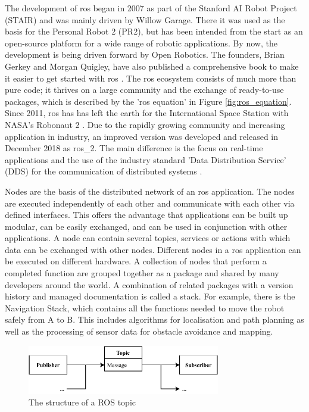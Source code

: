 The development of \gls{ros} began in 2007 as part of the Stanford AI Robot Project (STAIR) and was mainly driven by Willow Garage. There it was used as the basis for the Personal Robot 2 (PR2), but has been intended from the start as an open-source platform for a wide range of robotic applications. By now, the development is being driven forward by Open Robotics. The founders, Brian Gerkey and Morgan Quigley, have also published a comprehensive book to make it easier to get started with \gls{ros} \cite{quigley_programming_2015}. The \gls{ros} ecosystem consists of much more than pure code; it thrives on a large community and the exchange of ready-to-use packages, which is described by the '\gls{ros} equation' in Figure \ref{fig:ros_equation}. Since 2011, \gls{ros} has has left the earth for the International Space Station with NASA's Robonaut 2 \cite{koubaa_ros_2016}. Due to the rapidly growing community and increasing application in industry, an improved version was developed and released in December 2018 as \gls{ros_2}. The main difference is the focus on real-time applications and the use of the industry standard 'Data Distribution Service' (DDS) for the communication of distributed systems \cite{macenski_robot_2022}.

Nodes are the basis of the distributed network of an \gls{ros} application. The nodes are executed independently of each other and communicate with each other via defined interfaces. This offers the advantage that applications can be built up modular, can be easily exchanged, and can be used in conjunction with other applications. A node can contain several topics, services or actions with which data can be exchanged with other nodes. Different nodes in a \gls{ros} application can be executed on different hardware. A collection of nodes that perform a completed function are grouped together as a package and shared by many developers around the world. A combination of related packages with a version history and managed documentation is called a stack. For example, there is the Navigation Stack, which contains all the functions needed to move the robot safely from A to B. This includes algorithms for localisation and path planning as well as the processing of sensor data for obstacle avoidance and mapping.

\begin{figure}[h]
    \centering
    \includegraphics[width=0.75\textwidth]{figures/20_state_of_the_art/topics.pdf}
    \caption{The structure of a ROS topic}
    \label{fig:topics}
\end{figure}

